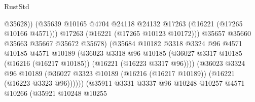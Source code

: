 \begin{lexlean}{RustStd}
\begin{coremodule}
                                            @35628))
                                        (@35639
                                          @10165
                                          @4704
                                          @24118
                                          @24132
                                          @17263
                                          (@16221 (@17265 @10166 @4571)))
                                        @17263
                                        (@16221 (@17265 @10123 @10172)))
                                      @35657
                                      @35660
                                      @35663
                                      @35667
                                      @35672
                                      @35678)
                                    (@35684
                                      @10182
                                      @3318
                                      @3324
                                      @96
                                      @4571
                                      @10185
                                      @4571
                                      @10189
                                      (@36023
                                        @3318
                                        @96
                                        @10185
                                        (@36027
                                          @3317
                                          @10185
                                          (@16216 (@16217 @10185))
                                          (@16221 (@16223 @3317 @96))))
                                      (@36023
                                        @3324
                                        @96
                                        @10189
                                        (@36027
                                          @3323
                                          @10189
                                          (@16216 (@16217 @10189))
                                          (@16221 (@16223 @3323 @96))))))
                                  (@35911
                                    @3331
                                    @3337
                                    @96
                                    @10248
                                    @10257
                                    @4571
                                    @10266
                                    (@35921
                                      @10248
                                      @10255

\end{coremodule}
\end{lexlean}
